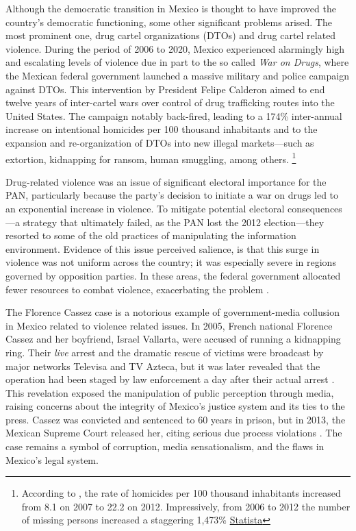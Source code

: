 Although the democratic transition in Mexico is thought to have improved the country's democratic functioning, some other significant problems arised. The most prominent one, drug cartel organizations (DTOs) and drug cartel related violence. During the period of 2006 to 2020, Mexico experienced alarmingly high and escalating levels of violence due in part to the so called \textit{War on Drugs}, where the Mexican federal government launched a massive military and police campaign against DTOs. This intervention by President Felipe Calderon aimed to end twelve years of inter-cartel wars over control of drug trafficking routes into the United States. The campaign notably back-fired, leading to a 174\% inter-annual increase on intentional homicides per 100 thousand inhabitants and to the expansion and re-organization of DTOs into new illegal markets—such as extortion, kidnapping for ransom, human smuggling, among others. \footnote{According to \citep{Patrones-INEGI}, the rate of homicides per 100 thousand inhabitants increased from 8.1 on 2007 to 22.2 on 2012. Impressively, from 2006 to 2012 the number of missing persons increased a staggering 1,473\% \href{https://es.statista.com/estadisticas/1268415/numero-anual-de-personas-desaparecidas-en-mexico/}{Statista}} 

Drug-related violence was an issue of significant electoral importance for the PAN, particularly because the party's decision to initiate a war on drugs led to an exponential increase in violence. To mitigate potential electoral consequences—a strategy that ultimately failed, as the PAN lost the 2012 election—they resorted to some of the old practices of manipulating the information environment. Evidence of this issue perceived salience, is that this surge in violence was not uniform across the country; it was especially severe in regions governed by opposition parties. In these areas, the federal government allocated fewer resources to combat violence, exacerbating the problem \citep{Federalism-Trejo-PoliGob}.

The Florence Cassez case is a notorious example of government-media collusion in Mexico related to violence related issues. In 2005, French national Florence Cassez and her boyfriend, Israel Vallarta, were accused of running a kidnapping ring. Their \textit{live} arrest and the dramatic rescue of victims were broadcast by major networks Televisa and TV Azteca, but it was later revealed that the operation had been staged by law enforcement a day after their actual arrest \citep{Cassez-Guardian}. This revelation exposed the manipulation of public perception through media, raising concerns about the integrity of Mexico's justice system and its ties to the press. Cassez was convicted and sentenced to 60 years in prison, but in 2013, the Mexican Supreme Court released her, citing serious due process violations \citep{Cassez-BBC}. The case remains a symbol of corruption, media sensationalism, and the flaws in Mexico's legal system. 

